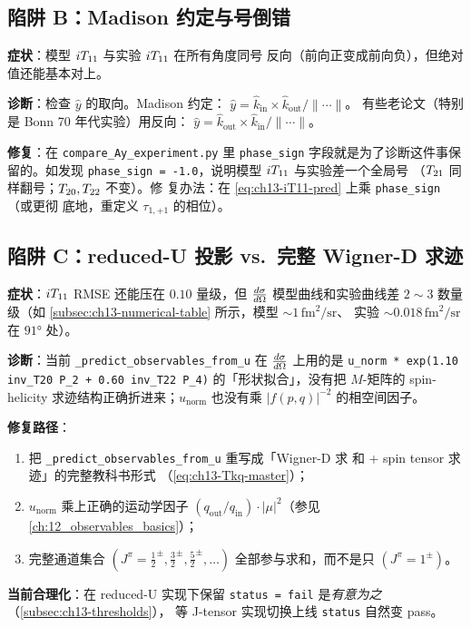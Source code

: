 \subsection{陷阱 B：Madison 约定与号倒错}
\label{subsec:ch13-pitfall-madison}

\begin{pitfallbox}
\textbf{症状}：模型 \({i T_{11}}\) 与实验 \({i T_{11}}\) 在所有角度同号
反向（前向正变成前向负），但绝对值还能基本对上。

\textbf{诊断}：检查 \(\hat{y}\) 的取向。Madison 约定：
\(\hat{y} = \hat{k}_{\text{in}} \times \hat{k}_{\text{out}} / \|\cdots\|\)。
有些老论文（特别是 Bonn 70 年代实验）用反向：
\(\hat{y} = \hat{k}_{\text{out}} \times \hat{k}_{\text{in}} / \|\cdots\|\)。

\textbf{修复}：在 \texttt{compare\_Ay\_experiment.py} 里
\texttt{phase\_sign} 字段就是为了诊断这件事保留的。如发现
\texttt{phase\_sign = -1.0}，说明模型 \({i T_{11}}\) 与实验差一个全局号
（\({T_{21}}\) 同样翻号；\({T_{20}}, {T_{22}}\) 不变）。修
复办法：在 \cref{eq:ch13-iT11-pred} 上乘 \texttt{phase\_sign}（或更彻
底地，重定义 \(\tau_{1,+1}\) 的相位）。
\end{pitfallbox}

\subsection{陷阱 C：reduced-U 投影 vs.\ 完整 Wigner-D 求迹}
\label{subsec:ch13-pitfall-reducedU-vs-full}

\begin{pitfallbox}
\textbf{症状}：\({i T_{11}}\) RMSE 还能压在 \(0.10\) 量级，但
\(\frac{d\sigma}{d\Omega}\) 模型曲线和实验曲线差 \(2\sim 3\) 数量级（如
\cref{subsec:ch13-numerical-table} 所示，模型 \(\sim 1\,\text{fm}^2/\text{sr}\)、
实验 \(\sim 0.018\,\text{fm}^2/\text{sr}\) 在 \(91°\) 处）。

\textbf{诊断}：当前 \texttt{\_predict\_observables\_from\_u} 在
\(\frac{d\sigma}{d\Omega}\) 上用的是 \texttt{u\_norm * exp(1.10 inv\_T20 P\_2 + 0.60
inv\_T22 P\_4)} 的「形状拟合」，没有把 \(M\)-矩阵的
spin-helicity 求迹结构正确折进来；\(u_{\text{norm}}\) 也没有乘
\(\big|f(p, q)\big|^{-2}\) 的相空间因子。

\textbf{修复路径}：
\begin{enumerate}
  \item 把 \texttt{\_predict\_observables\_from\_u} 重写成「Wigner-D 求
        和 + spin tensor 求迹」的完整教科书形式
        （\cref{eq:ch13-Tkq-master}）；
  \item \(u_{\text{norm}}\) 乘上正确的运动学因子
        \((q_{\text{out}} / q_{\text{in}}) \cdot |\mu|^2\)（参见
        \cref{ch:12_observables_basics}）；
  \item 完整通道集合 \((J^\pi = \tfrac{1}{2}^{\pm}, \tfrac{3}{2}^{\pm},
        \tfrac{5}{2}^{\pm}, \ldots)\) 全部参与求和，而不是只
        \((J^\pi = 1^\pm)\)。
\end{enumerate}

\textbf{当前合理化}：在 reduced-U 实现下保留
\texttt{status = fail} 是\emph{有意为之}（\cref{subsec:ch13-thresholds}），
等 J-tensor 实现切换上线 \texttt{status} 自然变 pass。
\end{pitfallbox}

